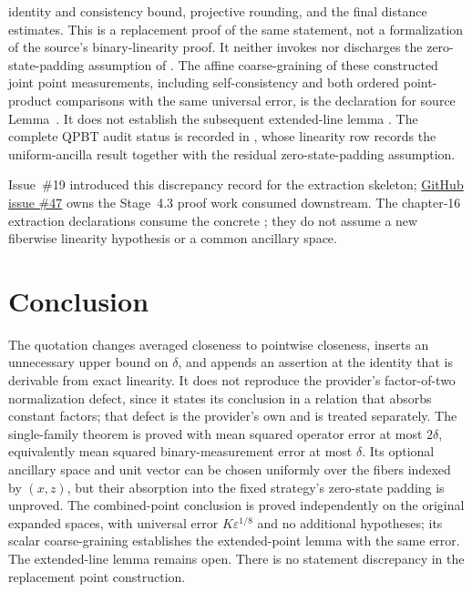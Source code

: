 \documentclass[11pt]{article}
\renewcommand{\ghissue}[1]{%
  \href{https://github.com/Dengnifer/MIPStarRE-QPBT/issues/#1}{GitHub issue \##1}}
\begin{document}
identity and consistency bound, projective rounding, and the final distance
estimates.  This is a replacement proof of the same statement, not a
formalization of the source's binary-linearity proof. It neither invokes nor
discharges the zero-state-padding assumption of .
The affine coarse-graining of these constructed joint point measurements,
including self-consistency and both ordered point-product comparisons with
the same universal error, is the declaration  for
source Lemma~. It does not establish the subsequent
extended-line lemma .
The complete QPBT audit status is recorded in
, whose linearity row records the
uniform-ancilla result together with the residual zero-state-padding
assumption.

Issue~\#19 introduced this discrepancy record for the extraction skeleton;
\ghissue{47} owns the Stage~4.3 proof work consumed downstream.  The chapter-16
extraction declarations consume the concrete ; they
do not assume a new fiberwise linearity hypothesis or a common ancillary space.

\section{Conclusion}

The quotation changes averaged closeness to pointwise closeness, inserts an
unnecessary upper bound on $\delta$, and appends an assertion at the identity
that is derivable from exact linearity.  It does not reproduce the provider's
factor-of-two normalization defect, since it states its conclusion in a
relation that absorbs constant factors; that defect is the provider's own and
is treated separately. The single-family theorem is proved with mean squared
operator error at most $2\delta$, equivalently mean squared binary-measurement
error at most $\delta$. Its optional ancillary space and unit vector can be
chosen uniformly over the fibers indexed by $(x,z)$, but their absorption
into the fixed strategy's zero-state padding is unproved. The combined-point
conclusion is proved independently on the original expanded spaces, with
universal error $K\varepsilon^{1/8}$ and no additional hypotheses; its scalar
coarse-graining establishes the extended-point lemma with the same error.
The extended-line lemma remains open. There is no statement discrepancy in
the replacement point construction.



\end{document}
